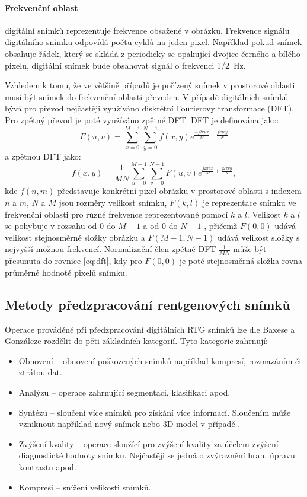 \paragraph{Frekvenční oblast}
digitální snímků reprezentuje frekvence obsažené v obrázku. Frekvence signálu digitálního snímku odpovídá počtu cyklů na jeden pixel. Například pokud snímek obsahuje řádek, který se skládá z periodicky se opakující dvojice černého a bílého pixelu, digitální snímek bude obsahovat signál o frekvenci \SI{1/2}{\hertz}. 

Vzhledem k tomu, že ve většině případů je pořízený snímek v prostorové oblasti musí být snímek do frekvenční oblasti převeden. V případě digitálních snímků bývá pro převod nejčastěji využíváno diskrétní Fourierovy transformace (DFT). Pro zpětný převod je poté využíváno zpětné DFT. DFT je definována jako:
\begin{equation}
\label{eq:dft}
F(u,v)=\sum_{x=0}^{M-1} \sum_{y=0}^{N-1} f(x,y) e^{\frac{-j2\pi ux}{M} - \frac{j2\pi vy}{N}}
\end{equation}
a zpětnou DFT jako:
\begin{equation}
f(x,y)=\frac{1}{MN}\sum_{u=0}^{M-1}\sum_{v=0}^{N-1}F(u,v)e^{\frac{j2\pi ux}{M}+\frac{j2\pi vy}{N}},
\end{equation}
kde $f(n,m)$ představuje konkrétní pixel obrázku v prostorové oblasti s indexem $n$ a $m$, $N$ a $M$ jsou rozměry velikost snímku, $F(k,l)$ je reprezentace snímku ve frekvenční oblasti pro různé frekvence reprezentované pomocí $k$ a $l$. Velikost $k$ a $l$ se pohybuje v rozsahu od 0 do $M-1$ a od 0 do $N-1$
, přičemž $F(0,0)$ udává velikost stejnosměrné složky obrázku a $F(M-1,N-1)$ udává velikost složky s nejvyšší možnou frekvencí. Normalizační člen zpětné DFT $\frac{1}{MN}$ může být přesunuta do rovnice \ref{eq:dft}, kdy pro $F(0,0)$ je poté stejnosměrná složka rovna průměrné hodnotě pixelů snímku.

\subsection{Metody předzpracování rentgenových snímků}
Operace prováděné při předzpracování digitálních RTG snímků lze dle Baxese \cite{baxes} a Gonzáleze \cite{Gonzalez} rozdělit do pěti základních kategorií. Tyto kategorie zahrnují:
\begin{itemize}
\item Obnovení -- obnovení poškozených snímků například kompresí, rozmazáním či ztrátou dat.
\item Analýzu -- operace zahrnující segmentaci, klasifikaci apod. 
\item Syntézu -- sloučení více snímků pro získání více informací. Sloučením může vzniknout například nový snímek nebo 3D model v případě .
\item Zvýšení kvality -- operace sloužící pro zvýšení kvality za účelem zvýšení diagnostické hodnoty snímku. Nejčastěji se jedná o zvýraznění hran, úpravu kontrastu apod.
\item Kompresi -- snížení velikosti snímků.
\end{itemize}

